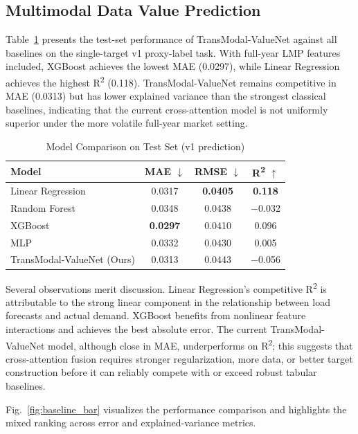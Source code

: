 \documentclass{ieeeaccess}
\begin{document}
\subsection{Multimodal Data Value Prediction}

Table~\ref{tab:valuation_results} presents the test-set performance of TransModal-ValueNet against all baselines on the single-target v1 proxy-label task. With full-year LMP features included, XGBoost achieves the lowest MAE (0.0297), while Linear Regression achieves the highest R\textsuperscript{2} (0.118). TransModal-ValueNet remains competitive in MAE (0.0313) but has lower explained variance than the strongest classical baselines, indicating that the current cross-attention model is not uniformly superior under the more volatile full-year market setting.

\begin{table}[t!]
  \caption{Model Comparison on Test Set (v1 prediction)}
  \label{tab:valuation_results}
  \centering
  \begin{tabular}{lccc}
  \toprule
  \textbf{Model} & \textbf{MAE} $\downarrow$ & \textbf{RMSE} $\downarrow$ & \textbf{R\textsuperscript{2}} $\uparrow$ \\
  \midrule
  Linear Regression & 0.0317 & \textbf{0.0405} & \textbf{0.118} \\
  Random Forest & 0.0348 & 0.0438 & $-$0.032 \\
  XGBoost & \textbf{0.0297} & 0.0410 & 0.096 \\
  MLP & 0.0332 & 0.0430 & 0.005 \\
  \midrule
  TransModal-ValueNet (Ours) & 0.0313 & 0.0443 & $-$0.056 \\
  \bottomrule
  \end{tabular}
\end{table}

Several observations merit discussion. Linear Regression's competitive R\textsuperscript{2} is attributable to the strong linear component in the relationship between load forecasts and actual demand. XGBoost benefits from nonlinear feature interactions and achieves the best absolute error. The current TransModal-ValueNet model, although close in MAE, underperforms on R\textsuperscript{2}; this suggests that cross-attention fusion requires stronger regularization, more data, or better target construction before it can reliably compete with or exceed robust tabular baselines.

Fig.~\ref{fig:baseline_bar} visualizes the performance comparison and highlights the mixed ranking across error and explained-variance metrics.
\end{document}
